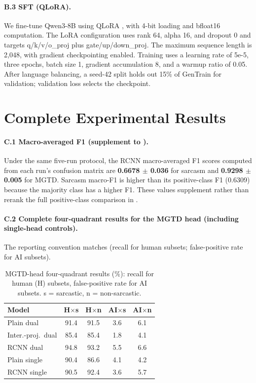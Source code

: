 \paragraph{B.3 SFT (QLoRA).} We fine-tune Qwen3-8B using QLoRA \citep{dettmers2023qlora}, with 4-bit loading and bfloat16 computation. The LoRA configuration \citep{hu2022lora} uses rank 64, alpha 16, and dropout 0 and targets q/k/v/o\_proj plus gate/up/down\_proj. The maximum sequence length is 2{,}048, with gradient checkpointing enabled. Training uses a learning rate of 5e-5, three epochs, batch size 1, gradient accumulation 8, and a warmup ratio of 0.05. After language balancing, a seed-42 split holds out 15\% of GenTrain for validation; validation loss selects the checkpoint.

\section{Complete Experimental Results}
\label{app:results}

\label{app:c1}\paragraph{C.1 Macro-averaged F1 (supplement to ).} Under the same five-run protocol, the RCNN macro-averaged F1 scores computed from each run's confusion matrix are \textbf{0.6678 $\pm$ 0.036} for sarcasm and \textbf{0.9298 $\pm$ 0.005} for MGTD. Sarcasm macro-F1 is higher than its positive-class F1 (0.6309) because the majority class has a higher F1. These values supplement rather than rerank the full positive-class comparison in .

\paragraph{C.2 Complete four-quadrant results for the MGTD head (including single-head controls).} The reporting convention matches  (recall for human subsets; false-positive rate for AI subsets).

\begin{table}[h]
  \centering
  \small
  \setlength{\tabcolsep}{3.5pt}
  \begin{tabular}{@{}p{1.9cm}cccc@{}}
    \toprule
    \textbf{Model} & \textbf{H$\times$s} & \textbf{H$\times$n} & \textbf{AI$\times$s} & \textbf{AI$\times$n} \\
    \midrule
    Plain dual & 91.4 & 91.5 & 3.6 & 6.1 \\
    Inter.-proj.\ dual & 85.4 & 85.4 & 1.8 & 4.1 \\
    RCNN dual & 94.8 & 93.2 & 5.5 & 6.6 \\
    Plain single & 90.4 & 86.6 & 4.1 & 4.2 \\
    RCNN single & 90.5 & 92.4 & 3.6 & 5.7 \\
    \bottomrule
  \end{tabular}
  \caption{MGTD-head four-quadrant results (\%): recall for human (H) subsets, false-positive rate for AI subsets. s = sarcastic, n = non-sarcastic.}
  \label{tab:auth-quadrant}
\end{table}

